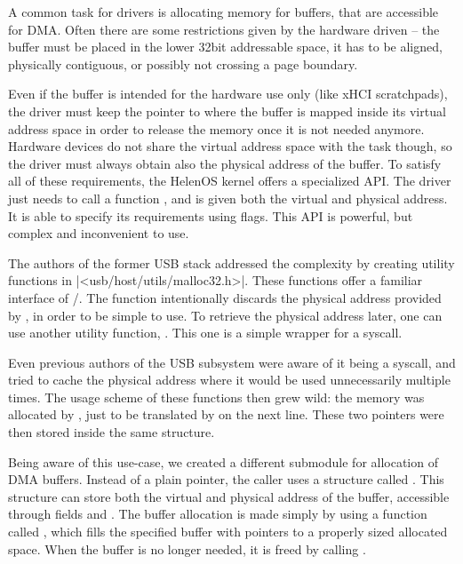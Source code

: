 A common task for drivers is allocating memory for buffers, that are accessible
for DMA. Often there are some restrictions given by the hardware driven -- the
buffer must be placed in the lower 32bit addressable space, it has to be
aligned, physically contiguous, or possibly not crossing a page boundary.

Even if the buffer is intended for the hardware use only (like xHCI
scratchpads), the driver must keep the pointer to where the buffer is mapped
inside its virtual address space in order to release the memory once it is not
needed anymore. Hardware devices do not share the virtual address space with
the task though, so the driver must always obtain also the physical address of
the buffer. To satisfy all of these requirements, the HelenOS kernel offers
a specialized API. The driver just needs to call a function
, and is given both the virtual and physical address. It
is able to specify its requirements using flags. This API is powerful, but
complex and inconvenient to use.

The authors of the former USB stack addressed the complexity by creating
utility functions in \header|<usb/host/utils/malloc32.h>|. These functions offer
a familiar interface of /. The  function
intentionally discards the physical address provided by
, in order to be simple to use. To retrieve the physical
address later, one can use another utility function, . This
one is a simple wrapper for a syscall.

Even previous authors of the USB subsystem were aware of it being a syscall,
and tried to cache the physical address where it would be used unnecessarily
multiple times. The usage scheme of these functions then grew wild: the memory
was allocated by , just to be translated by  on
the next line. These two pointers were then stored inside the same structure.

Being aware of this use-case, we created a different submodule for allocation
of DMA buffers. Instead of a plain pointer, the caller uses a structure called
. This structure can store both the virtual and physical
address of the buffer, accessible through fields  and
. The buffer allocation is made simply by using a function called
, which fills the specified buffer with pointers to
a properly sized allocated space. When the buffer is no longer needed, it is
freed by calling .

